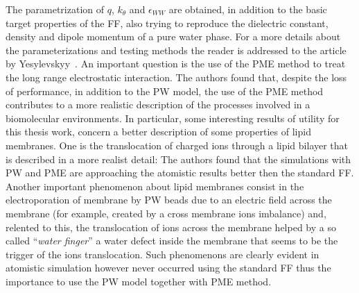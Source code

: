 The parametrization of $q$, $k_\theta$ and $\epsilon_{WW}$ are obtained, in addition to the basic target properties of the \martini \ac{FF}, also trying to reproduce the dielectric constant, density and dipole momentum of a pure water phase. For a more details about the parameterizations and testing methods the reader is addressed to the article by Yesylevskyy \etal\,\cite{PW}. An important question is the use of the \ac{PME} method to treat the long range electrostatic interaction. The authors found that, despite the loss of performance, in addition to the \ac{PW} model, the use of the \ac{PME} method contributes to a more realistic description of the processes involved in a biomolecular environments. In particular, some interesting results of utility for this thesis work, concern a better description of some properties of lipid membranes. One is the translocation of charged ions through a lipid bilayer that is described in a more realist detail: The authors found that the simulations with \ac{PW} and \ac{PME} are approaching the atomistic results better then the standard \martini \ac{FF}. Another important phenomenon about lipid membranes consist in the electroporation of membrane by \ac{PW} beads due to an electric field across the membrane (for example, created by a cross membrane ions imbalance) and, relented to this, the translocation of ions across the membrane helped by a so called ``\textit{water finger}'' a water defect inside the membrane that seems to be the trigger of the ions translocation. Such phenomenons are clearly evident in atomistic simulation however never occurred using the standard \martini \ac{FF} thus the importance to use the \ac{PW} model together with \ac{PME} method.


